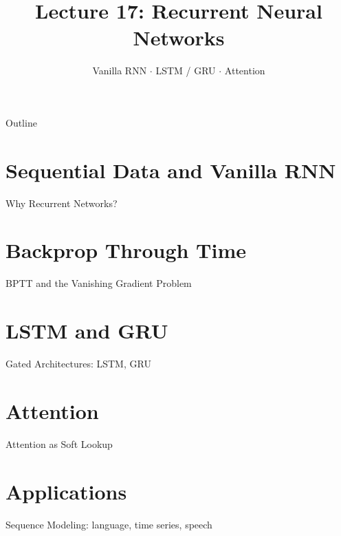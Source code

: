 \documentclass[aspectratio=169]{beamer}
\title{Lecture 17: Recurrent Neural Networks}
\subtitle{Vanilla RNN $\cdot$ LSTM / GRU $\cdot$ Attention}
\date{}
\begin{document}
\begin{frame}\titlepage\end{frame}

\begin{frame}{Outline}
  \tableofcontents
\end{frame}

\section{Sequential Data and Vanilla RNN}
\begin{frame}{Why Recurrent Networks?}
\end{frame}

\section{Backprop Through Time}
\begin{frame}{BPTT and the Vanishing Gradient Problem}
\end{frame}

\section{LSTM and GRU}
\begin{frame}{Gated Architectures: LSTM, GRU}
\end{frame}

\section{Attention}
\begin{frame}{Attention as Soft Lookup}
\end{frame}

\section{Applications}
\begin{frame}{Sequence Modeling: language, time series, speech}
\end{frame}
\end{document}
